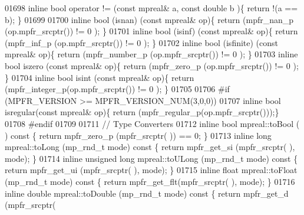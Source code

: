 \begin{DoxyCode}
01698 \textcolor{keyword}{inline} \textcolor{keywordtype}{bool} operator != (\textcolor{keyword}{const} mpreal& a, \textcolor{keyword}{const} \textcolor{keywordtype}{double} b            )\{  \textcolor{keywordflow}{return} !(a == b);  \}
01699 
01700 \textcolor{keyword}{inline} bool (isnan)    (\textcolor{keyword}{const} mpreal& op)\{    \textcolor{keywordflow}{return} (mpfr\_nan\_p    (op.mpfr\_srcptr()) != 0 );    \}
01701 \textcolor{keyword}{inline} bool (isinf)    (\textcolor{keyword}{const} mpreal& op)\{    \textcolor{keywordflow}{return} (mpfr\_inf\_p    (op.mpfr\_srcptr()) != 0 );    \}
01702 \textcolor{keyword}{inline} bool (isfinite) (\textcolor{keyword}{const} mpreal& op)\{    \textcolor{keywordflow}{return} (mpfr\_number\_p (op.mpfr\_srcptr()) != 0 );    \}
01703 \textcolor{keyword}{inline} \textcolor{keywordtype}{bool} iszero   (\textcolor{keyword}{const} mpreal& op)\{    \textcolor{keywordflow}{return} (mpfr\_zero\_p   (op.mpfr\_srcptr()) != 0 );    \}
01704 \textcolor{keyword}{inline} \textcolor{keywordtype}{bool} isint    (\textcolor{keyword}{const} mpreal& op)\{    \textcolor{keywordflow}{return} (mpfr\_integer\_p(op.mpfr\_srcptr()) != 0 );    \}
01705 
01706 \textcolor{preprocessor}{#if (MPFR\_VERSION >= MPFR\_VERSION\_NUM(3,0,0))}
01707 \textcolor{keyword}{inline} \textcolor{keywordtype}{bool} isregular(\textcolor{keyword}{const} mpreal& op)\{    \textcolor{keywordflow}{return} (mpfr\_regular\_p(op.mpfr\_srcptr()));\}
01708 \textcolor{preprocessor}{#endif}
01709 
01711 \textcolor{comment}{// Type Converters}
01712 \textcolor{keyword}{inline} \textcolor{keywordtype}{bool}               mpreal::toBool   (             )\textcolor{keyword}{  const    }\{    \textcolor{keywordflow}{return}  mpfr\_zero\_p (mpfr\_srcptr(
      )) == 0;     \}
01713 \textcolor{keyword}{inline} \textcolor{keywordtype}{long}               mpreal::toLong   (mp\_rnd\_t mode)\textcolor{keyword}{  const    }\{    \textcolor{keywordflow}{return}  mpfr\_get\_si (mpfr\_srcptr(
      ), mode);    \}
01714 \textcolor{keyword}{inline} \textcolor{keywordtype}{unsigned} \textcolor{keywordtype}{long}      mpreal::toULong  (mp\_rnd\_t mode)\textcolor{keyword}{  const    }\{    \textcolor{keywordflow}{return}  mpfr\_get\_ui (mpfr\_srcptr(
      ), mode);    \}
01715 \textcolor{keyword}{inline} \textcolor{keywordtype}{float}              mpreal::toFloat  (mp\_rnd\_t mode)\textcolor{keyword}{  const    }\{    \textcolor{keywordflow}{return}  mpfr\_get\_flt(mpfr\_srcptr(
      ), mode);    \}
01716 \textcolor{keyword}{inline} \textcolor{keywordtype}{double}             mpreal::toDouble (mp\_rnd\_t mode)\textcolor{keyword}{  const    }\{    \textcolor{keywordflow}{return}  mpfr\_get\_d  (mpfr\_srcptr(

\end{DoxyCode}
